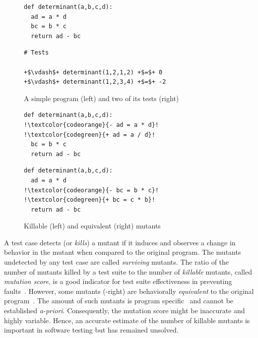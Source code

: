 \documentclass[sigconf]{acmart}
\begin{document}
\begin{figure}[t]
\begin{minipage}{.45\columnwidth}  %
\begin{lstlisting}[style=python]
def determinant(a,b,c,d):
  ad = a * d
  bc = b * c
  return ad - bc
\end{lstlisting}
\end{minipage}
\hfill
\begin{minipage}{0.5\columnwidth} %
\begin{lstlisting}[style=python,escapechar=+, numbers=none]
# Tests

+$\vdash$+ determinant(1,2,1,2) +$=$+ 0
+$\vdash$+ determinant(1,2,3,4) +$=$+ -2
\end{lstlisting}
\end{minipage}
\caption{A simple program (left) and two of its tests (right)}
\label{fig:working-example}
\end{figure}
\begin{figure}[t]
\begin{minipage}{.45\columnwidth}  %
\begin{lstlisting}[style=python,escapechar=!]
def determinant(a,b,c,d):
!\textcolor{codeorange}{- ad = a * d}!
!\textcolor{codegreen}{+ ad = a / d}!
  bc = b * c
  return ad - bc
\end{lstlisting}
\end{minipage}
\hfill
\begin{minipage}{0.5\columnwidth} %
\begin{lstlisting}[style=python,escapechar=!, numbers=none]
def determinant(a,b,c,d):
  ad = a * d
!\textcolor{codeorange}{- bc = b * c}!
!\textcolor{codegreen}{+ bc = c * b}!
  return ad - bc
\end{lstlisting}
\end{minipage}
\caption{Killable (left) and equivalent (right) mutants}
\label{fig:working-example-mutants}
\end{figure}

A test case detects (or \emph{kills}) a mutant if it induces and observes
a change in behavior in the mutant when compared to the original program.
The mutants undetected by any test case are called \emph{surviving} mutants.
The ratio of the number of mutants killed by a test suite to the 
number of \emph{killable} mutants,
called \emph{mutation score}, is a good indicator for test suite
effectiveness in preventing faults~\cite{jia2010an}.
However,
some mutants (-right)
are behaviorally \emph{equivalent} to the original program~\cite{budd1982two}.
The amount of
such mutants is
program specific~\cite{offutt1994using,grun2009impact}  %
and cannot be established 
\emph{a-priori}.
Consequently, the mutation score
might be inaccurate and highly variable.
Hence, an accurate estimate of the number of killable mutants is important in software testing but has remained unsolved.
\end{document}
